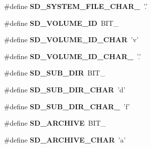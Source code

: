 \begin{DoxyCompactItemize}
\item 
\hypertarget{group__sd__private_ga3c9808ece8f4df9a3617e58a2205f63d}{\#define {\bfseries \-S\-D\-\_\-\-S\-Y\-S\-T\-E\-M\-\_\-\-F\-I\-L\-E\-\_\-\-C\-H\-A\-R\-\_\-}~'.'}\label{group__sd__private_ga3c9808ece8f4df9a3617e58a2205f63d}

\item 
\hypertarget{group__sd__private_gac794c4f9589b3eaa8e0ee0b63d98820e}{\#define {\bfseries \-S\-D\-\_\-\-V\-O\-L\-U\-M\-E\-\_\-\-I\-D}~\-B\-I\-T\-\_}\label{group__sd__private_gac794c4f9589b3eaa8e0ee0b63d98820e}

\item 
\hypertarget{group__sd__private_ga235f01641df7f555f877e3c39f060f61}{\#define {\bfseries \-S\-D\-\_\-\-V\-O\-L\-U\-M\-E\-\_\-\-I\-D\-\_\-\-C\-H\-A\-R}~'v'}\label{group__sd__private_ga235f01641df7f555f877e3c39f060f61}

\item 
\hypertarget{group__sd__private_ga520ba40d06018f8c754e74c9d6932c46}{\#define {\bfseries \-S\-D\-\_\-\-V\-O\-L\-U\-M\-E\-\_\-\-I\-D\-\_\-\-C\-H\-A\-R\-\_\-}~'.'}\label{group__sd__private_ga520ba40d06018f8c754e74c9d6932c46}

\item 
\hypertarget{group__sd__private_ga691ddb8eedc120af2b2639c5925fb9e5}{\#define {\bfseries \-S\-D\-\_\-\-S\-U\-B\-\_\-\-D\-I\-R}~\-B\-I\-T\-\_}\label{group__sd__private_ga691ddb8eedc120af2b2639c5925fb9e5}

\item 
\hypertarget{group__sd__private_gaa70663f270266175757bfc6ac4a7f3e3}{\#define {\bfseries \-S\-D\-\_\-\-S\-U\-B\-\_\-\-D\-I\-R\-\_\-\-C\-H\-A\-R}~'d'}\label{group__sd__private_gaa70663f270266175757bfc6ac4a7f3e3}

\item 
\hypertarget{group__sd__private_ga0da54a50b2020b9eb9c4c8f53355eb31}{\#define {\bfseries \-S\-D\-\_\-\-S\-U\-B\-\_\-\-D\-I\-R\-\_\-\-C\-H\-A\-R\-\_\-}~'f'}\label{group__sd__private_ga0da54a50b2020b9eb9c4c8f53355eb31}

\item 
\hypertarget{group__sd__private_gaa50136103ba84801694465f39bdaad65}{\#define {\bfseries \-S\-D\-\_\-\-A\-R\-C\-H\-I\-V\-E}~\-B\-I\-T\-\_}\label{group__sd__private_gaa50136103ba84801694465f39bdaad65}

\item 
\hypertarget{group__sd__private_ga5a196a6fec6538e8057b45f76a8a6c10}{\#define {\bfseries \-S\-D\-\_\-\-A\-R\-C\-H\-I\-V\-E\-\_\-\-C\-H\-A\-R}~'a'}\label{group__sd__private_ga5a196a6fec6538e8057b45f76a8a6c10}


\end{DoxyCompactItemize}
